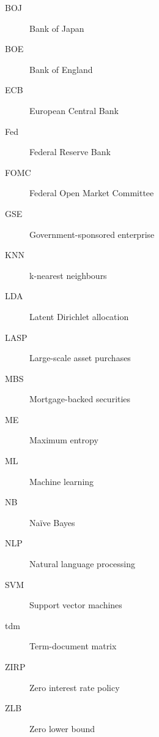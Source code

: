%
\begin{description}
	\item[BOJ] Bank of Japan
	\item[BOE] Bank of England
	\item[ECB] European Central Bank
	\item[Fed] Federal Reserve Bank
	\item[FOMC] Federal Open Market Committee
	\item[GSE] Government-sponsored enterprise
	\item[KNN] k-nearest neighbours
	\item[LDA] Latent Dirichlet allocation
	\item[LASP] Large-scale asset purchases
	\item[MBS] Mortgage-backed securities
	\item[ME] Maximum entropy
	\item[ML] Machine learning
	\item[NB] Na\"{i}ve Bayes
	\item[NLP] Natural language processing
	\item[SVM] Support vector machines
	\item[tdm] Term-document matrix
	\item[ZIRP] Zero interest rate policy
	\item[ZLB] Zero lower bound
\end{description}